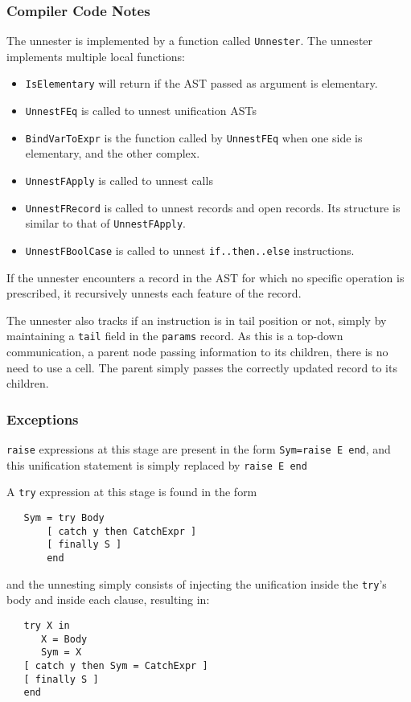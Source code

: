 \documentclass[a4paper]{memoir}
\begin{document}
\subsubsection{Compiler Code Notes}
The unnester is implemented by a function called \lstinline!Unnester!. The unnester implements multiple local functions:
\begin{itemize}
  \item  \lstinline!IsElementary! will return if the AST passed as argument is elementary.
  \item  \lstinline!UnnestFEq! is called to unnest unification ASTs
  \item  \lstinline!BindVarToExpr! is the function called by \lstinline!UnnestFEq! when one side is elementary, and the other complex.
  \item  \lstinline!UnnestFApply! is called to unnest calls
  \item  \lstinline!UnnestFRecord! is called to unnest records and open records. Its structure is similar to that of \lstinline!UnnestFApply!.
  \item  \lstinline!UnnestFBoolCase! is called to unnest \lstinline!if..then..else! instructions.
\end{itemize}
If the unnester encounters a record in the AST for which no specific operation is prescribed, it recursively unnests each feature of the record.

The unnester also tracks if an instruction is in tail position or not, simply by
maintaining a \lstinline!tail! field in the \lstinline!params! record. As this
is a top-down communication, a parent node passing information to its children,
there is no need to use a cell. The parent simply passes the correctly updated
record to its children.

\subsubsection{Exceptions}\label{sec:arch:unnester:exceptions}
\lstinline!raise! expressions at this stage are present in the form
\lstinline!Sym=raise E end!, and this unification statement is simply replaced by
\lstinline!raise E end! 

A \lstinline!try! expression at this stage is found in the form 
\begin{lstlisting}
   Sym = try Body 
       [ catch y then CatchExpr ] 
       [ finally S ] 
       end
\end{lstlisting}
and the unnesting simply consists of injecting the unification inside the
\lstinline!try!'s body and inside each clause, resulting in:
\begin{lstlisting}
   try X in 
      X = Body 
      Sym = X 
   [ catch y then Sym = CatchExpr ] 
   [ finally S ] 
   end
\end{lstlisting}
\end{document}
